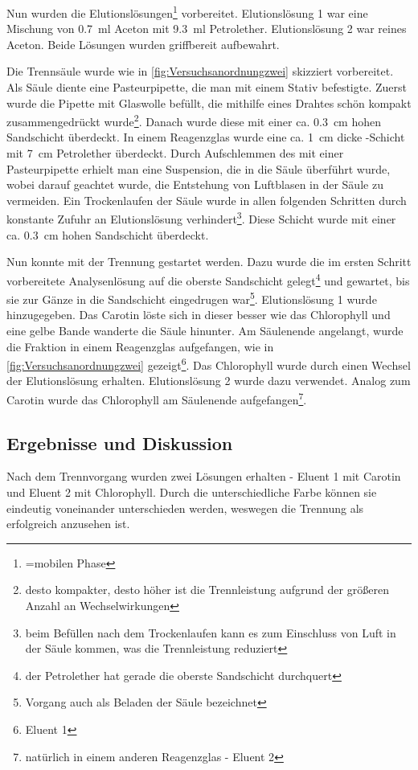 \documentclass{article}
\begin{document}
        Nun wurden die Elutionslösungen\footnote{=mobilen Phase} vorbereitet. Elutionslösung 1 war eine Mischung von \SI[mode=text]{0.7}{\milli\litre} Aceton mit \SI[mode=text]{9.3}{\milli\litre} Petrolether. Elutionslösung 2 war reines Aceton. Beide Lösungen wurden griffbereit aufbewahrt.
        
        Die Trennsäule wurde wie in \ref{fig:Versuchsanordnungzwei} skizziert vorbereitet. Als Säule diente eine Pasteurpipette, die man mit einem Stativ befestigte. Zuerst wurde die Pipette mit Glaswolle befüllt, die mithilfe eines Drahtes schön kompakt zusammengedrückt wurde\footnote{desto kompakter, desto höher ist die Trennleistung aufgrund der größeren Anzahl an Wechselwirkungen}. Danach wurde diese mit einer ca. \SI[mode=text]{0.3}{\centi\meter} hohen Sandschicht überdeckt. In einem Reagenzglas wurde eine ca. \SI[mode=text]{1}{\centi\meter} dicke -Schicht mit \SI[mode=text]{7}{\centi\meter} Petrolether überdeckt. Durch Aufschlemmen des  mit einer Pasteurpipette  erhielt man eine Suspension, die in die Säule überführt wurde, wobei darauf geachtet wurde, die Entstehung von Luftblasen in der Säule zu vermeiden. Ein Trockenlaufen der Säule wurde in allen folgenden Schritten durch konstante Zufuhr an Elutionslösung verhindert\footnote{beim Befüllen nach dem Trockenlaufen kann es zum Einschluss von Luft in der Säule kommen, was die Trennleistung reduziert}. Diese Schicht wurde mit einer ca. \SI[mode=text]{0.3}{\centi\meter} hohen Sandschicht überdeckt. 
        
        Nun konnte mit der Trennung gestartet werden. Dazu wurde die im ersten Schritt vorbereitete Analysenlösung auf die oberste Sandschicht gelegt\footnote{der Petrolether hat gerade die oberste Sandschicht durchquert} und gewartet, bis sie zur Gänze in die Sandschicht eingedrugen war\footnote{Vorgang auch als Beladen der Säule bezeichnet}. Elutionslösung 1 wurde hinzugegeben. Das Carotin löste sich in dieser besser wie das Chlorophyll und eine gelbe Bande wanderte die Säule hinunter. Am Säulenende angelangt, wurde die Fraktion in einem Reagenzglas aufgefangen, wie in \ref{fig:Versuchsanordnungzwei} gezeigt\footnote{Eluent 1}. Das Chlorophyll wurde durch einen Wechsel der Elutionslösung erhalten. Elutionslösung 2 wurde dazu verwendet. Analog zum Carotin wurde das Chlorophyll am Säulenende aufgefangen\footnote{natürlich in einem anderen Reagenzglas - Eluent 2}.
        
    \subsection{Ergebnisse und Diskussion}
    
      Nach dem Trennvorgang wurden zwei Lösungen erhalten - Eluent 1 mit Carotin und Eluent 2 mit Chlorophyll. Durch die unterschiedliche Farbe können sie eindeutig voneinander unterschieden werden, weswegen die Trennung als erfolgreich anzusehen ist.
      
  \pagebreak
  
  \listofreactions
  \printbibliography[title=Literaturverzeichnis]
  \listoffigures
  \listoftables
  
\end{document}
